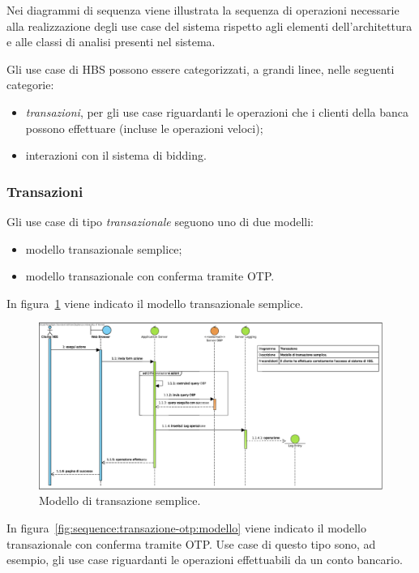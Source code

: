 
Nei diagrammi di sequenza viene illustrata la sequenza di operazioni necessarie alla realizzazione degli use case del sistema rispetto agli elementi dell'architettura e alle classi di analisi presenti nel sistema.

Gli use case di HBS possono essere categorizzati, a grandi linee, nelle seguenti categorie:
\begin{itemize}
	\item \emph{transazioni}, per gli use case riguardanti le operazioni che i clienti della banca possono effettuare (incluse le operazioni veloci);

	\item interazioni con il sistema di bidding.
\end{itemize}

\subsubsection{Transazioni}

Gli use case di tipo \emph{transazionale} seguono uno di due modelli:
\begin{itemize}
	\item modello transazionale semplice;

	\item modello transazionale con conferma tramite OTP.
\end{itemize}

In figura~\ref{fig:sequence:transazione:modello} viene indicato il modello transazionale semplice.

\begin{figure}[h]
	\centering
	\includegraphics[width=\textheight, angle=90]{Images/sequence/Transazione.eps}
	\caption{Modello di transazione semplice.}
	\label{fig:sequence:transazione:modello}
\end{figure}

In figura~\ref{fig:sequence:transazione-otp:modello} viene indicato il modello transazionale con conferma tramite OTP.
Use case di questo tipo sono, ad esempio, gli use case riguardanti le operazioni effettuabili da un conto bancario.

